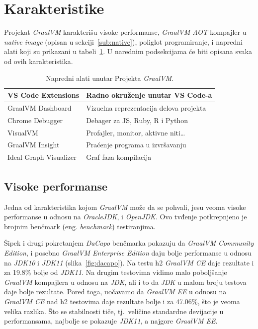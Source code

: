 \documentclass[a4paper]{article}
\begin{document}
\section{Karakteristike}
\label{sec:karakteristike}

Projekat \emph{GraalVM} karakterišu visoke performanse, \emph{GraalVM AOT} kompajler u \emph{native image} (opisan u sekciji~\ref{sub:native}), poliglot programiranje, i napredni alati \cite{graalvm} koji su prikazani u tabeli~\ref{alati}. U narednim podsekcijama će biti opisana svaka od ovih karakteristika.

\begin{table}
    \centering
    \begin{tabular}{|l|l|}
        \hline
        VS Code Extensions & Radno okruženje unutar VS Code-a\\
        \hline
        GraalVM Dashboard & Vizuelna reprezentacija delova projekta\\
        \hline
        Chrome Debugger & Debager za JS, Ruby, R i Python\\
        \hline
        VisualVM & Profajler, monitor, aktivne niti\ldots\\
        \hline
        GraalVM Insight & Praćenje programa u izvršavanju\\
        \hline
        Ideal Graph Visualizer & Graf faza kompilacija\\
        \hline
    \end{tabular}
    \caption{Napredni alati unutar Projekta \emph{GraalVM}.}
    \label{alati}
\end{table}

\subsection{Visoke performanse}
\label{sub:perf}

Jedna od karakteristika kojom \emph{GraalVM} može da se pohvali, jesu veoma visoke performanse u odnosu na \emph{OracleJDK}, i \emph{OpenJDK}. Ovo tvđenje potkrepnjeno je brojnim benčmark (eng. \emph{benchmark}) testiranjima. 

Šipek i drugi \cite{vsipek19} pokretanjem \emph{DaCapo} benčmarka \cite{dacapo} pokazuju da \emph{GraalVM Community Edition}, i posebno \emph{GraalVM Enterprise Edition} daju bolje performanse u odnosu na \emph{JDK10} i \emph{JDK11} (slika~\ref{fig:dacapo}). Na testu h2 \emph{GraalVM CE} daje rezultate i za 19.8\% bolje od \emph{JDK11}. Na drugim testovima vidimo malo poboljšanje \emph{GraalVM} kompajlera u odnosu na \emph{JDK}, ali i to da \emph{JDK} u malom broju testova daje bolje rezultate. Pored toga, uočavamo da \emph{GraalVM EE} u odnosu na \emph{GraalVM CE} nad h2 testovima daje rezultate bolje i za 47.06\%, što je veoma velika razlika. Što se stabilnosti tiče, tj.\ veličine standardne devijacije u performansama, najbolje se pokazuje \emph{JDK11}, a najgore \emph{GraalVM EE}.
\end{document}
